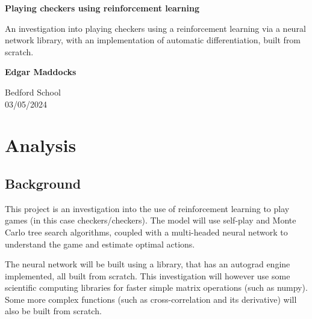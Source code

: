 \documentclass{article}
\begin{document}
\begin{titlepage}
    \begin{center}
        \vspace*{1cm}
            
        \Huge
        \textbf{Playing checkers using reinforcement learning}
            
        \vspace{0.5cm}
        \LARGE
        An investigation into playing checkers using a reinforcement learning via a neural network library, with an implementation of
        automatic differentiation, built from scratch.
            
        \vspace{1.5cm}
            
        \textbf{Edgar Maddocks}            
        \vfill
            
        \vspace{0.8cm}
                        
        \Large
        Bedford School\\
        03/05/2024\\
            
    \end{center}
\end{titlepage}

    \pagebreak

    \tableofcontents

    \section{Analysis}
    \subsection{Background}
    This project is an investigation into the use of reinforcement learning to play games (in this case checkers/checkers).
    The model will use self-play and Monte Carlo tree search algorithms, coupled with a multi-headed neural network to
    understand the game and estimate optimal actions.

    The neural network will be built using a library, that has an autograd engine implemented, all built from scratch. This
    investigation will however use some scientific computing libraries for faster simple matrix operations (such as numpy). Some more
    complex functions (such as cross-correlation and its derivative) will also be built from scratch.
\end{document}

